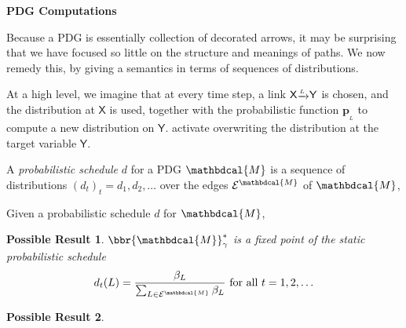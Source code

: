 \documentclass{article}
\newtheorem{poss}{Possible Result}
\theoremstyle{definition}
\theoremstyle{remark}
\newcommand\mat[1]{\mathbf{#1}}
\newcommand{\bp}[1][L]{\mat{p}_{\!_{#1}\!}}
\newcommand{\Ed}{\mathcal E}
\newcommand{\ed}[3]{\var{#2}
	\overset{\smash{\mskip-5mu\raisebox{-3pt}{$\scriptscriptstyle
				#1$}}}{\raisebox{-1pt}{$\xrightarrow{\hphantom{\scriptscriptstyle#1}}$}} \var{#3}}
\newcommand{\dg}[1]{\mathbdcal{#1}}
\newcommand{\var}[1]{\mathsf{#1}}
\begin{document}
\begin{center}
  \textbf{ \Large PDG Computations} 
\end{center}


Because a PDG is essentially collection of decorated arrows, it may be surprising that we have focused so little on the structure and meanings of paths. We now remedy this, by giving a semantics in terms of sequences of distributions.



At a high level, we imagine that at every time step, a link $\ed LXY$ is chosen, and the distribution at $\var X$ is used, together with the probabilistic function $\bp[L]$ to compute a new distribution on $\var Y$.  activate overwriting the distribution at the target variable $\var Y$. 


\begin{defn}
	A \emph{probabilistic schedule} $d$ for a PDG $\dg M$ is a sequence of distributions $(d_t)_t =d_1, d_2, \ldots$ over the edges $\Ed^{\dg M}$ of $\dg M$, 
\end{defn}

Given a probabilistic schedule $d$ for $\dg M$, 

\begin{poss}
	$\bbr{\dg M}_\gamma^*$ is a fixed point of the static probabilistic schedule
	\[ d_t(L) = \frac{\beta_L}{\sum_{L \in \Ed^{\dg M}} \beta_L} \text{ for all } t=1,2,\ldots  \]
\end{poss}

\begin{poss}
	
\end{poss}


\end{document}
